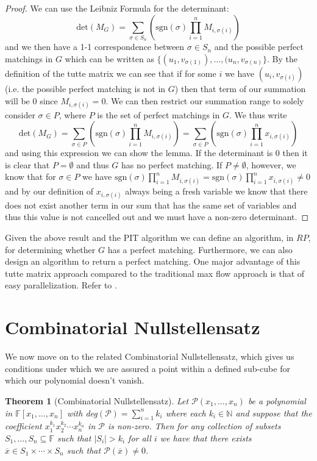 \documentclass[11pt]{article}
\newtheorem{theorem}{Theorem}
\theoremstyle{definition}
\numberwithin{equation}{subsection}
\begin{document}
\begin{proof}
We can use the Leibniz Formula for the determinant: $$\text{det}(M_G)=\sum_{\sigma\in S_n}\left(\text{sgn}(\sigma)\prod_{i=1}^n M_{i,\sigma(i)}\right)$$ and we then have a 1-1 correspondence between $\sigma\in S_n$ and the possible perfect matchings in $G$ which can be written as $\{(u_1,v_{\sigma(1)}),\ldots,(u_n,v_{\sigma(n)}\}$. By the definition of the tutte matrix we can see that if for some $i$ we have $(u_i,v_{\sigma(i)})$ (i.e. the possible perfect matching is not in $G$) then that term of our summation will be $0$ since $M_{i,\sigma(i)}=0$. We can then restrict our summation range to solely consider $\sigma\in P$, where $P$ is the set of perfect matchings in $G$. We thus write $$\text{det}(M_G)=\sum_{\sigma\in P}\left(\text{sgn}(\sigma)\prod_{i=1}^n M_{i,\sigma(i)}\right)=\sum_{\sigma\in P}\left(\text{sgn}(\sigma)\prod_{i=1}^n x_{i,\sigma(i)}\right)$$ and using this expression we can show the lemma. If the determinant is $0$ then it is clear that $P=\emptyset$ and thus $G$ has no perfect matching. If $P\neq\emptyset$, however, we know that for $\sigma\in P$ we have $\text{sgn}(\sigma)\prod_{i=1}^n M_{i,\sigma(i)}=\text{sgn}(\sigma)\prod_{i=1}^n x_{i,\sigma(i)}\neq 0$ and by our definition of $x_{i,\sigma(i)}$ always being a fresh variable we know that there does not exist another term in our sum that has the same set of variables and thus this value is not cancelled out and we must have a non-zero determinant.
\end{proof}

Given the above result and the PIT algorithm we can define an algorithm, in $RP$, for determining whether $G$ has a perfect matching. Furthermore, we can also design an algorithm to return a perfect matching. One major advantage of this tutte matrix approach compared to the traditional max flow approach is that of easy parallelization. Refer to \cite{Mulmuley}.

\section{Combinatorial Nullstellensatz}

We now move on to the related Combinatorial Nullstellensatz, \cite{Alon, Michalek} which gives us conditions under which we are assured a point within a defined sub-cube for which our polynomial doesn't vanish.

\begin{theorem}[Combinatorial Nullstellensatz]
Let $\mathcal{P}(x_1,\ldots,x_n)$ be a polynomial in $\mathbb{F}[x_1,\ldots,x_n]$ with deg$(\mathcal{P})=\sum_{i=1}^n k_i$ where each $k_i\in\mathbb{N}$ and suppose that the coefficient $x_1^{k_1}x_2^{k_2}\cdots x_n^{k_n}$ in $\mathcal{P}$ is non-zero. Then for any collection of subsets $S_1,\ldots,S_n\subseteq \mathbb{F}$ such that $|S_i|>k_i$ for all $i$ we have that there exists $\overline{x}\in S_1\times\cdots\times S_n$ such that $\mathcal{P}(\overline{x})\neq 0$.
\end{theorem}
\end{document}
